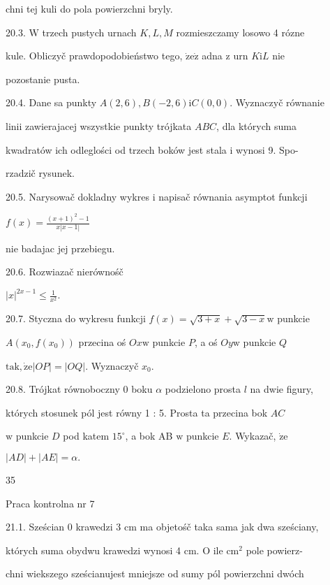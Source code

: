 \documentclass[a4paper,12pt]{article}
\begin{document}
chni tej kuli do pola powierzchni bryly.

20.3. $\mathrm{W}$ trzech pustych urnach $K, L, M$ rozmieszczamy losowo 4 rózne

kule. Obliczyč prawdopodobieństwo tego, $\dot{\mathrm{z}}\mathrm{e}\dot{\mathrm{z}}$ adna $\mathrm{z}$ urn $K\mathrm{i}L$ nie

pozostanie pusta.

20.4. Dane sa punkty $A(2,6), B(-2,6) \mathrm{i} C(0,0)$. Wyznaczyč równanie

linii zawierajacej wszystkie punkty trójkata $ABC$, dla których suma

kwadratów ich odleglości od trzech boków jest stala $\mathrm{i}$ wynosi 9. Spo-

rzadzič rysunek.

20.5. Narysowač dokladny wykres $\mathrm{i}$ napisač równania asymptot funkcji

$f(x)=\displaystyle \frac{(x+1)^{2}-1}{x|x-1|}$

nie badajac jej przebiegu.

20.6. Rozwiazač nierównośč

$|x|^{2x-1}\displaystyle \leq\frac{1}{x^{2}}.$

20.7. Styczna do wykresu funkcji $f(x) = \sqrt{3+x}+\sqrt{3-x} \mathrm{w}$ punkcie

$A(x_{0},f(x_{0}))$ przecina oś $Ox \mathrm{w}$ punkcie $P$, a oś $Oy \mathrm{w}$ punkcie $Q$

$\mathrm{t}\mathrm{a}\mathrm{k}, \dot{\mathrm{z}}\mathrm{e} |OP|=|OQ|$. Wyznaczyč $x_{0}.$

20.8. Trójkat równoboczny $0$ boku $\alpha$ podzielono prosta $l$ na dwie figury,

których stosunek pól jest równy 1 : 5. Prosta ta przecina bok $AC$

$\mathrm{w}$ punkcie $D$ pod katem $15^{\circ}$, a bok AB $\mathrm{w}$ punkcie $E$. Wykazač, $\dot{\mathrm{z}}\mathrm{e}$

$|AD|+|AE|=\alpha.$





35

Praca kontrolna nr 7

21.1. Sześcian $0$ krawedzi 3 cm ma objetośč taka sama jak dwa sześciany,

których suma obydwu krawedzi wynosi 4 cm. $\mathrm{O}$ ile $\mathrm{c}\mathrm{m}^{2}$ pole powierz-

chni wiekszego sześcianujest mniejsze od sumy pól powierzchni dwóch
\end{document}
